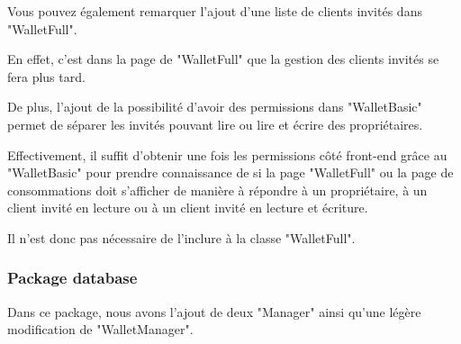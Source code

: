 \begin{flushleft}
Vous pouvez également remarquer l'ajout d'une liste de clients invités dans "WalletFull".
\end{flushleft}

\begin{flushleft}
En effet, c'est dans la page de "WalletFull" que la gestion des clients invités se fera plus tard.
\end{flushleft}

\begin{flushleft}
De plus, l'ajout de la possibilité d'avoir des permissions dans "WalletBasic" permet de séparer les invités pouvant lire ou lire et écrire des propriétaires.
\end{flushleft}

\begin{flushleft}
Effectivement, il suffit d'obtenir une fois les permissions côté front-end grâce au "WalletBasic" pour prendre connaissance de si la page "WalletFull" ou la page de consommations doit s'afficher de manière à répondre à un propriétaire, à un client invité en lecture ou à un client invité en lecture et écriture.
\end{flushleft}

\begin{flushleft}
Il n'est donc pas nécessaire de l'inclure à la classe "WalletFull".
\end{flushleft}
\newpage

\subsubsection{Package database}

\begin{flushleft}
Dans ce package, nous avons l'ajout de deux "Manager" ainsi qu'une légère modification de "WalletManager".
\end{flushleft}

